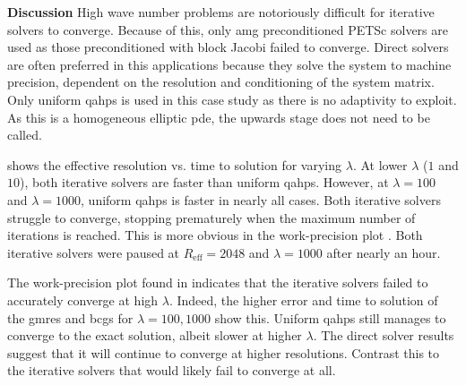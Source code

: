 {\bf Discussion}
High wave number problems are notoriously difficult for iterative solvers to converge. Because of this, only \gls{amg} preconditioned PETSc solvers are used as those preconditioned with block Jacobi failed to converge. Direct solvers are often preferred in this applications because they solve the system to machine precision, dependent on the resolution and conditioning of the system matrix. Only uniform \gls{qahps} is used in this case study as there is no adaptivity to exploit. As this is a homogeneous elliptic \gls{pde}, the upwards stage does not need to be called.

 shows the effective resolution vs. time to solution for varying $\lambda$. At lower $\lambda$ ($1$ and $10$), both iterative solvers are faster than uniform \gls{qahps}. However, at $\lambda = 100$ and $\lambda = 1000$, uniform \gls{qahps} is faster in nearly all cases. Both iterative solvers struggle to converge, stopping prematurely when the maximum number of iterations is reached. This is more obvious in the work-precision plot . Both iterative solvers were paused at $R_{\text{eff}} = 2048$ and $\lambda = 1000$ after nearly an hour.

The work-precision plot found in  indicates that the iterative solvers failed to accurately converge at high $\lambda$. Indeed, the higher error and time to solution of the \gls{gmres} and \gls{bcgs} for $\lambda = 100, 1000$ show this. Uniform \gls{qahps} still manages to converge to the exact solution, albeit slower at higher $\lambda$. The direct solver results suggest that it will continue to converge at higher resolutions. Contrast this to the iterative solvers that would likely fail to converge at all.